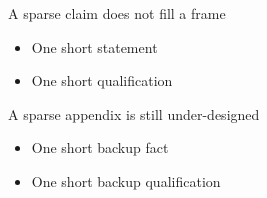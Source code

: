 \documentclass[11pt,aspectratio=169]{beamer}
\begin{document}
\begin{frame}[t]{A sparse claim does not fill a frame}
  \medskip
  \begin{itemize}
    \item One short statement
    \item One short qualification
  \end{itemize}
\end{frame}
\AppendixStart
\begin{frame}[t]{A sparse appendix is still under-designed}
  \medskip
  \begin{itemize}
    \item One short backup fact
    \item One short backup qualification
  \end{itemize}
\end{frame}
\end{document}

